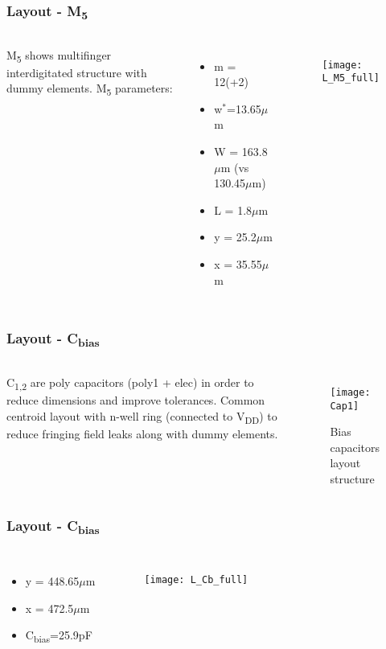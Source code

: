 \begin{frame}
	\frametitle{Layout - M\textsubscript{5}}
	\begin{columns}
		M\textsubscript{5} shows multifinger interdigitated structure with dummy 	elements. M\textsubscript{5} parameters:
		\begin{itemize}
			\item m = 12(+2)
			\item w$^*$=13.65$\mu$m
			\item W = 163.8$\mu$m (vs 130.45$\mu$m)
			\item L = 1.8$\mu$m
			\item y = 25.2$\mu$m
			\item x = 35.55$\mu$m
		\end{itemize}
		\begin{figure}[H]
			\centering
			\texttt{[image: L\_M5\_full]}
			\label{L_M5_full}
		\end{figure}
	\end{columns}
\end{frame}

\begin{frame}
\frametitle{Layout - C\textsubscript{bias}}
\begin{columns}
	\column{0.6\textwidth}
	C\textsubscript{1,2} are poly capacitors (poly1 + elec) in order to reduce dimensions and improve tolerances. Common centroid layout with n-well ring (connected to V\textsubscript{DD}) to reduce fringing field leaks along with dummy elements.

	\column{0.4\textwidth}
	\begin{figure}[H]
		\centering
		\texttt{[image: Cap1]}
		\caption{Bias capacitors layout structure}
		\label{Cap1}
	\end{figure}
\end{columns}
\end{frame}

\begin{frame}
\frametitle{Layout - C\textsubscript{bias}}
\begin{columns}
	\column{0.4\textwidth}
	\begin{itemize}
		\item y = 448.65$\mu$m
		\item x = 472.5$\mu$m
		\item C\textsubscript{bias}=25.9pF
	\end{itemize}
	\begin{figure}[H]
		\centering
		\texttt{[image: L\_Cb\_full]}
		\label{L_Cb_full}
	\end{figure}
\end{columns}
\end{frame}

